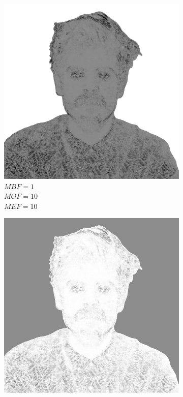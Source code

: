 \documentclass[a4paper, 12pt, polish, twoside]{extreport}
\begin{document}
\begin{figure}[H]
\begin{subfigure}{0.32\textwidth}
        \includegraphics[width = \textwidth]{img/4-mine/taco-mask/taco_mask_c20_inv0_bg1_obj10_ed10.png}
        \caption{\(MBF = 1\) \\ \(MOF = 10\) \\ \(MEF = 10\)}
        \label{mine-param-taco-g}
    \end{subfigure}
    \begin{subfigure}{0.32\textwidth}
        \centering
        \includegraphics[width = \textwidth]{img/4-mine/taco-mask/taco_mask_c20_inv0_bg10_obj1_ed10.png}

\end{subfigure}
\end{figure}
\end{document}
